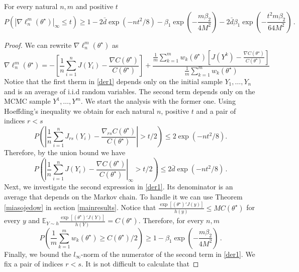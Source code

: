 \documentclass[twoside,11pt]{article}
\def\llnm{\ell_n^m}
\def\th{\theta}
\def\Ex{\mathbb{E}}
\def\ths{\th^\star}
\def\rs{_{rs}}
\def\grad{\nabla}
\def\bbd{\bar{d}}
\begin{document}
\begin{lemma}
\label{derivative}
For every natural $n,m$ and positive $t$
\begin{equation*}
 P \left( | \grad \llnm(\ths)|_\infty \leq t
\right) \geq 1 - 2 \bbd \exp \left( -nt^2/8 \right)
- \beta_1 \exp \left(  -  \frac{m \beta_2  }{4 M^2}                     \right)  -2 \bbd \beta_1 \exp \left(  -  \frac{ t^2 m \beta_2  }{64 M^2} \right)\,.
\end{equation*}
\end{lemma}
\begin{proof}
We can rewrite $\grad \llnm(\ths)$ as
\begin{equation}
\label{der1}
\grad \llnm(\ths) = - \left[\frac{1}{n} \sum_{i=1}^{n}    J(Y_i) - \frac{\grad C(\ths)}{C(\ths)} \right] +
\frac{\frac{1}{m} \sum\limits_{k=1}^{m} w_k(\ths) \left[ J(Y^k) - \frac{\grad C(\ths)}{C(\ths)} \right]}
                 {\frac{1}{m} \sum\limits_{k=1}^{m} w_k(\ths) }
\end{equation}
Notice that the first therm in \eqref{der1} depends only on the initial sample $Y_1, \ldots, Y_n$ and is an average of i.i.d random variables. The second term depends only on the MCMC sample $Y^1, \ldots, Y^m.$ We start the analysis with the former one.
Using Hoeffding's inequality we obtain for each natural $n$, positive $t$ and a pair of indices $r<s$
$$P \left(\left| \frac{1}{n} \sum_{i=1}^{n}    J \rs (Y_i) - \frac{\grad \rs C(\ths)}{C(\ths)} \right| > t/2
\right) \leq 2 \exp \left( -nt^2/8 \right).
 $$
Therefore, by the union bound we have   
\begin{equation}
\label{deriv_form}
P \left(\left| \frac{1}{n} \sum_{i=1}^{n}    J  (Y_i) - \frac{\grad  C(\ths)}{C(\ths)} \right|_\infty > t/2
\right) \leq 2 \bbd \exp \left( -nt^2/8 \right)\,.
\end{equation}
Next, we investigate the second expression in \eqref{der1}. Its denominator is an average that depends on the Markov chain. To handle it we can use Theorem \ref{miasojedow} in section \ref{mainresults}. 
Notice that $\frac{\exp[(\ths)'J(y)]}{h(y)} \leq M C(\ths)$ for every $y$ and 
$\Ex_{Y \sim h} \frac{\exp\left[(\ths)'J(Y)\right]}{h(Y)} = C(\ths).$ Therefore, for every $n,m$ 
\begin{equation}
\label{der2}
P\left( \frac{1}{m} \sum\limits_{k=1}^{m} w_k(\ths) \geq C(\ths)/2
\right)  \geq 1- \beta_1 \exp \left(  -  \frac{m \beta_2  }{4 M^2}                     \right)\,.
\end{equation}
Finally, we bound the $l_\infty$-norm of the numerator of the second term in \eqref{der1}. We fix a pair of indices $r<s.$ It is not difficult to calculate that 

\end{proof}
\end{document}
